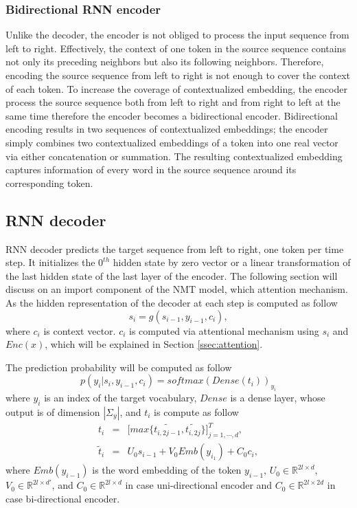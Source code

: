 \subsubsection{Bidirectional RNN encoder}
Unlike the decoder, the encoder is not obliged to process the input sequence from left to right. Effectively, the context of one token in the source sequence contains not only its preceding neighbors but also its following neighbors. Therefore, encoding the source sequence from left to right is not enough to cover the context of each token. To increase the coverage of contextualized embedding, the encoder process the source sequence both from left to right and from right to left at the same time therefore the encoder becomes a bidirectional encoder. Bidirectional encoding results in two sequences of contextualized embeddings; the encoder simply combines two contextualized embeddings of a token into one real vector via either concatenation or summation. The resulting contextualized embedding captures information of every word in the source sequence around its corresponding token. 
\subsection{RNN decoder}
RNN decoder predicts the target sequence from left to right, one token per time step. It initializes the $0^{th}$ hidden state by zero vector or a linear transformation of the last hidden state of the last layer of the encoder. The following section will discuss on an import component of the NMT model, which attention mechanism. As the hidden representation of the decoder at each step is computed as follow
\begin{equation}
s_i = g(s_{i-1},y_{i-1},c_i),
\end{equation}
where $c_i$ is context vector. $c_i$ is computed via attentional mechanism using $s_i$ and $Enc(x)$, which will be explained in Section \ref{ssec:attention}.

The prediction probability will be computed as follow
\begin{equation}
p(y_i|s_i,y_{i-1},c_i) = softmax(Dense(t_i))_{y_i}
\end{equation}
where $y_i$ is an index of the target vocabulary, $Dense$ is a dense layer, whose output is of dimension $|\Sigma_y|$, and $t_i$ is compute as follow
\begin{equation}
\begin{array}{rcl}
t_i &=& \big[ max\big\{ \tilde{t_{i,2j-1}}, \tilde{t_{i,2j}} \big\} \big]^{T}_{j=1,\cdots,d}, \\
\tilde{t}_i &=& U_0 s_{i-1} + V_0Emb(y_{i_1}) + C_0c_i,
\end{array}
\end{equation}
where $Emb(y_{i-1})$ is the word embedding of the token $y_{i-1}$, $U_0 \in \mathbb{R}^{2l\times d}$, $V_0 \in \mathbb{R}^{2l\times d'}$, and $C_0 \in \mathbb{R}^{2l\times d}$ in case uni-directional encoder and $C_0 \in \mathbb{R}^{2l\times 2d}$ in case bi-directional encoder.

